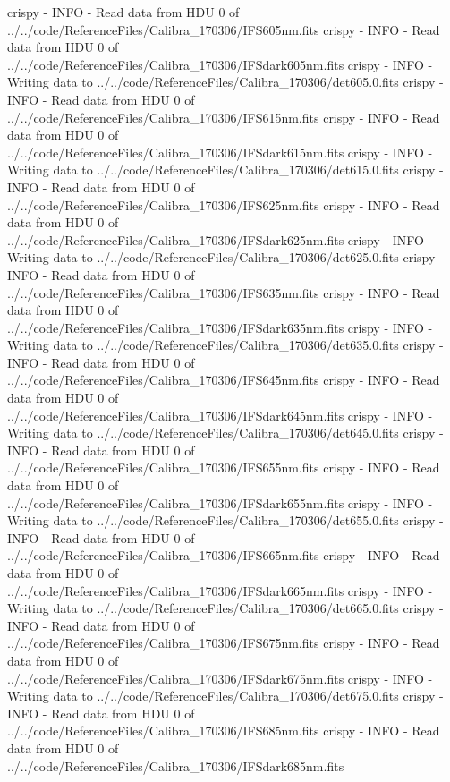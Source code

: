 \documentclass[letterpaper,10pt,english]{sphinxmanual}
\begin{document}
\begin{OriginalVerbatim}[commandchars=\\\{\}]
crispy - INFO - Read data from HDU 0 of ../../code/ReferenceFiles/Calibra_170306/IFS605nm.fits
crispy - INFO - Read data from HDU 0 of ../../code/ReferenceFiles/Calibra_170306/IFSdark605nm.fits
crispy - INFO - Writing data to ../../code/ReferenceFiles/Calibra_170306/det605.0.fits
crispy - INFO - Read data from HDU 0 of ../../code/ReferenceFiles/Calibra_170306/IFS615nm.fits
crispy - INFO - Read data from HDU 0 of ../../code/ReferenceFiles/Calibra_170306/IFSdark615nm.fits
crispy - INFO - Writing data to ../../code/ReferenceFiles/Calibra_170306/det615.0.fits
crispy - INFO - Read data from HDU 0 of ../../code/ReferenceFiles/Calibra_170306/IFS625nm.fits
crispy - INFO - Read data from HDU 0 of ../../code/ReferenceFiles/Calibra_170306/IFSdark625nm.fits
crispy - INFO - Writing data to ../../code/ReferenceFiles/Calibra_170306/det625.0.fits
crispy - INFO - Read data from HDU 0 of ../../code/ReferenceFiles/Calibra_170306/IFS635nm.fits
crispy - INFO - Read data from HDU 0 of ../../code/ReferenceFiles/Calibra_170306/IFSdark635nm.fits
crispy - INFO - Writing data to ../../code/ReferenceFiles/Calibra_170306/det635.0.fits
crispy - INFO - Read data from HDU 0 of ../../code/ReferenceFiles/Calibra_170306/IFS645nm.fits
crispy - INFO - Read data from HDU 0 of ../../code/ReferenceFiles/Calibra_170306/IFSdark645nm.fits
crispy - INFO - Writing data to ../../code/ReferenceFiles/Calibra_170306/det645.0.fits
crispy - INFO - Read data from HDU 0 of ../../code/ReferenceFiles/Calibra_170306/IFS655nm.fits
crispy - INFO - Read data from HDU 0 of ../../code/ReferenceFiles/Calibra_170306/IFSdark655nm.fits
crispy - INFO - Writing data to ../../code/ReferenceFiles/Calibra_170306/det655.0.fits
crispy - INFO - Read data from HDU 0 of ../../code/ReferenceFiles/Calibra_170306/IFS665nm.fits
crispy - INFO - Read data from HDU 0 of ../../code/ReferenceFiles/Calibra_170306/IFSdark665nm.fits
crispy - INFO - Writing data to ../../code/ReferenceFiles/Calibra_170306/det665.0.fits
crispy - INFO - Read data from HDU 0 of ../../code/ReferenceFiles/Calibra_170306/IFS675nm.fits
crispy - INFO - Read data from HDU 0 of ../../code/ReferenceFiles/Calibra_170306/IFSdark675nm.fits
crispy - INFO - Writing data to ../../code/ReferenceFiles/Calibra_170306/det675.0.fits
crispy - INFO - Read data from HDU 0 of ../../code/ReferenceFiles/Calibra_170306/IFS685nm.fits
crispy - INFO - Read data from HDU 0 of ../../code/ReferenceFiles/Calibra_170306/IFSdark685nm.fits

\end{OriginalVerbatim}
\end{document}
